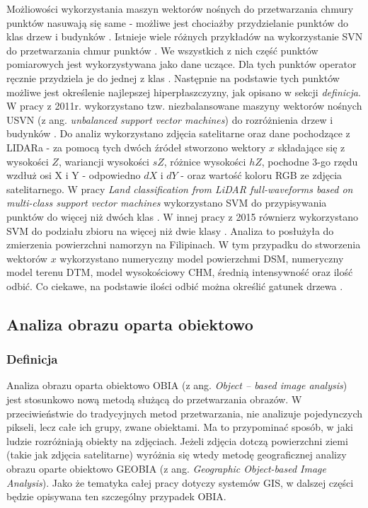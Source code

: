 Możliowości wykorzystania maszyn wektorów nośnych do przetwarzania chmury punktów nasuwają się same - możliwe jest chociażby przydzielanie punktów do klas drzew i budynków \cite{xwang2011}. Istnieje wiele 
różnych przykładów na wykorzystanie SVN do przetwarzania chmur punktów \cite{xwang2011,li2013,david2015}. We wszystkich z nich część punktów pomiarowych jest wykorzystywana jako dane uczące.
Dla tych punktów operator ręcznie przydziela je do jednej z klas \cite{xwang2011}. Następnie na podstawie tych punktów możliwe jest określenie najlepszej hiperpłaszczyzny, jak opisano w sekcji \textit{definicja}.
W pracy z 2011r. wykorzystano tzw. niezbalansowane maszyny wektorów nośnych USVN (z ang. \textit{unbalanced support vector machines}) do rozróżnienia drzew i budynków \cite{xwang2011}.
Do analiz wykorzystano zdjęcia satelitarne oraz dane pochodzące z LIDARa - za pomocą tych dwóch źródeł stworzono wektory $x$ składające się z wysokości $Z$, wariancji wysokości $sZ$, różnice wysokości $hZ$,
pochodne 3-go rzędu wzdłuż osi X i Y - odpowiedno $dX$ i $dY$ - oraz wartość koloru RGB ze zdjęcia satelitarnego. 
W pracy \textit{Land classification from LiDAR full-waveforms based on multi-class support vector machines} wykorzystano SVM do przypisywania punktów do więcej niż dwóch klas \cite{li2013}. 
W innej pracy z 2015 równierz wykorzystano SVM do podziału zbioru na więcej niż dwie klasy \cite{david2015}. Analiza to posłużyła do zmierzenia powierzchni namorzyn na Filipinach. 
W tym przypadku do stworzenia wektorów $x$ wykorzystano numeryczny model powierzchmi DSM, numeryczny model terenu DTM, model wysokościowy CHM, średnią intensywność oraz ilość odbić. Co ciekawe, na podstawie
ilości odbić można określić gatunek drzewa \cite{Sasaki2012}.

\subsection{Analiza obrazu oparta obiektowo}

\subsubsection{Definicja}

Analiza obrazu oparta obiektowo OBIA (z ang. \textit{Object – based image analysis}) jest stosunkowo nową metodą \cite{burnett2003} służącą do przetwarzania obrazów. W przeciwieństwie do tradycyjnych metod przetwarzania, 
nie analizuje pojedynczych pikseli, lecz całe ich grupy, zwane obiektami. Ma to przypominać sposób, w jaki ludzie rozróżniają obiekty na zdjęciach. Jeżeli zdjęcia dotczą powierzchni ziemi (takie jak zdjęcia 
satelitarne) wyróżnia się wtedy metodę geograficznej analizy obrazu oparte obiektowo GEOBIA (z ang. \textit{Geographic Object-based Image Analysis}). Jako że tematyka całej pracy dotyczy systemów GIS,
w dalszej części będzie opisywana ten szczególny przypadek OBIA.

